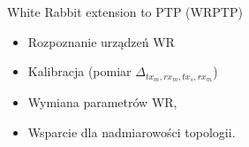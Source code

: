 \documentclass[compress,red]{beamer}
\begin{document}
% 
% 
% 
\begin{frame}{White Rabbit extension to PTP (WRPTP)}

  \begin{itemize}
    \item Rozpoznanie urządzeń WR
    \item Kalibracja (pomiar $\Delta_{tx_m, rx_m, tx_s, rx_m}$)
    \item Wymiana parametrów WR,
    \item Wsparcie dla nadmiarowości topologii.
  \end{itemize}

\end{frame}
\end{document}
